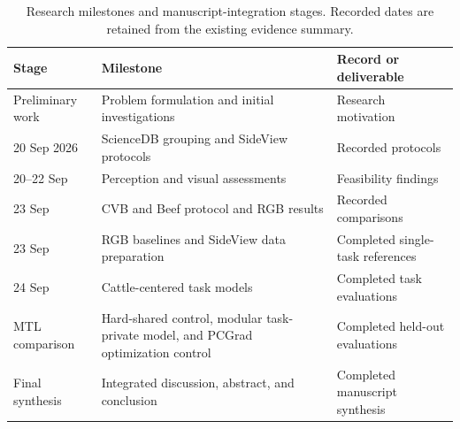 \begin{table}[htbp]
\centering\small
\caption[Research milestones]{Research milestones and manuscript-integration stages. Recorded dates are retained from the existing evidence summary.}\label{tab:timeline}
\begin{tabularx}{\textwidth}{lYY}
\toprule
Stage & Milestone & Record or deliverable \\
\midrule
Preliminary work & Problem formulation and initial investigations & Research motivation \\
20 Sep 2026 & ScienceDB grouping and SideView protocols & Recorded protocols \\
20--22 Sep & Perception and visual assessments & Feasibility findings \\
23 Sep & CVB and Beef protocol and RGB results & Recorded comparisons \\
23 Sep & RGB baselines and SideView data preparation & Completed single-task references \\
24 Sep & Cattle-centered task models & Completed task evaluations \\
MTL comparison & Hard-shared control, modular task-private model, and PCGrad optimization control & Completed held-out evaluations \\
Final synthesis & Integrated discussion, abstract, and conclusion & Completed manuscript synthesis \\
\bottomrule
\end{tabularx}
\end{table}
